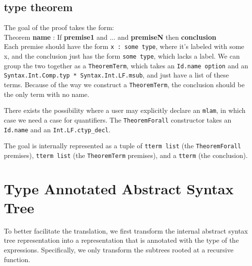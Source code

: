 \documentclass[11pt]{article}
\begin{document}
\subsection{type theorem}
The goal of the proof takes the form:\\
Theorem \textbf{name} : If \textbf{premise1} and ... and \textbf{premiseN} then \textbf{conclusion}\\
Each premise should have the form \verb+x : some type+, where it's labeled with some x, and the conclusion just has the form \verb+some type+, which lacks a label. We can group the two together as a \verb+TheoremTerm+, which takes an \verb+Id.name option+ and an \verb+Syntax.Int.Comp.typ * Syntax.Int.LF.msub+, and just have a list of these terms. Because of the way we construct a \verb+TheoremTerm+, the conclusion should be the only term with no name.

There exists the possibility where a user may explicitly declare an \verb+mlam+, in which case we need a case for quantifiers. The \verb+TheoremForall+ constructor takes an \verb+Id.name+ and an \verb+Int.LF.ctyp_decl+.

The goal is internally represented as a tuple of \verb+tterm list+ (the \verb+TheoremForall+ premises), \verb+tterm list+ (the \verb+TheoremTerm+ premises), and a \verb+tterm+ (the conclusion).

\section{Type Annotated Abstract Syntax Tree}

To better facilitate the translation, we first transform the internal abstract syntax tree representation into a representation that is annotated with the type of the expressions. Specifically, we only transform the subtrees rooted at a recursive function.
\end{document}
